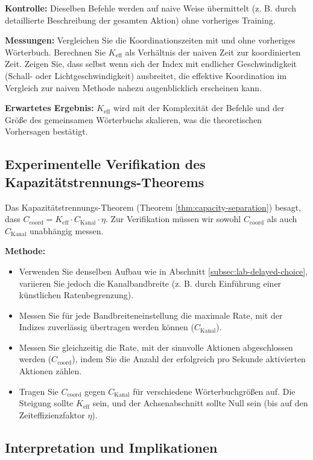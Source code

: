 \documentclass[12pt]{article}
\begin{document}
	\textbf{Kontrolle:} Dieselben Befehle werden auf naive Weise übermittelt (z. B. durch detaillierte Beschreibung der gesamten Aktion) ohne vorheriges Training.
	
	\textbf{Messungen:} Vergleichen Sie die Koordinationszeiten mit und ohne vorheriges Wörterbuch. Berechnen Sie \(K_{\mathrm{eff}}\) als Verhältnis der naiven Zeit zur koordinierten Zeit. Zeigen Sie, dass selbst wenn sich der Index mit endlicher Geschwindigkeit (Schall- oder Lichtgeschwindigkeit) ausbreitet, die effektive Koordination im Vergleich zur naiven Methode nahezu augenblicklich erscheinen kann.
	
	\textbf{Erwartetes Ergebnis:} \(K_{\mathrm{eff}}\) wird mit der Komplexität der Befehle und der Größe des gemeinsamen Wörterbuchs skalieren, was die theoretischen Vorhersagen bestätigt.
	
	\subsection{Experimentelle Verifikation des Kapazitätstrennungs-Theorems}
	\label{subsec:capacity-theorem}
	
	Das Kapazitätstrennungs-Theorem (Theorem \ref{thm:capacity-separation}) besagt, dass \(C_{\text{coord}} = K_{\mathrm{eff}} \cdot C_{\text{Kanal}} \cdot \eta\). Zur Verifikation müssen wir sowohl \(C_{\text{coord}}\) als auch \(C_{\text{Kanal}}\) unabhängig messen.
	
	\textbf{Methode:}
	\begin{itemize}
		\item Verwenden Sie denselben Aufbau wie in Abschnitt \ref{subsec:lab-delayed-choice}, variieren Sie jedoch die Kanalbandbreite (z. B. durch Einführung einer künstlichen Ratenbegrenzung).
		\item Messen Sie für jede Bandbreiteneinstellung die maximale Rate, mit der Indizes zuverlässig übertragen werden können (\(C_{\text{Kanal}}\)).
		\item Messen Sie gleichzeitig die Rate, mit der sinnvolle Aktionen abgeschlossen werden (\(C_{\text{coord}}\)), indem Sie die Anzahl der erfolgreich pro Sekunde aktivierten Aktionen zählen.
		\item Tragen Sie \(C_{\text{coord}}\) gegen \(C_{\text{Kanal}}\) für verschiedene Wörterbuchgrößen auf. Die Steigung sollte \(K_{\mathrm{eff}}\) sein, und der Achsenabschnitt sollte Null sein (bis auf den Zeiteffizienzfaktor \(\eta\)).
	\end{itemize}
	
	\subsection{Interpretation und Implikationen}
	
\end{document}
